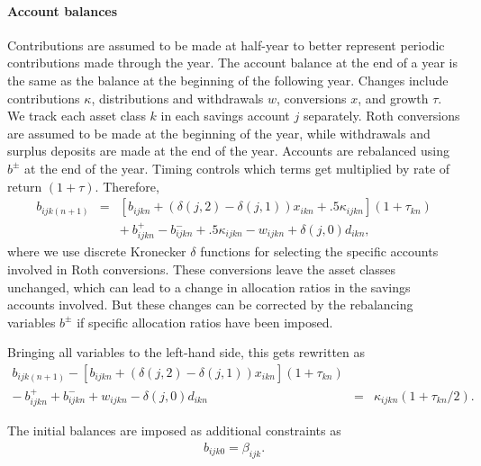 \documentclass{article}[fleqn,12pt]
\begin{document}
\paragraph*{Account balances}
	Contributions are assumed to be made at half-year to better represent periodic contributions
	made through the year.
	The account balance at the end of a year is the same as the balance
	at the beginning of the following year.
	Changes include contributions $\kappa$, distributions and withdrawals $w$,
	conversions $x$, and growth $\tau$.
	We track each asset class $k$ in each savings account $j$ separately.
	Roth conversions are assumed to be made at the beginning of the year, while withdrawals
	and surplus deposits are made at the end of the year.
	Accounts are rebalanced using $b^{\pm}$ at the end of the year.
	Timing controls which terms get multiplied by rate of return $(1 + \tau)$.
	Therefore,
	\begin{eqnarray}
		\label{Eq:C3a}
		b_{ijk(n+1)} &=& [b_{ijkn} + (\delta(j, 2) - \delta(j, 1))x_{ikn} 
		+ .5\kappa_{ijkn}](1 + \tau_{kn})
		\nonumber \\
		&& 
		+\ b^+_{ijkn} - b^-_{ijkn} 
		+ .5 \kappa_{ijkn} - w_{ijkn} + \delta(j, 0)d_{ikn},
	\end{eqnarray}
	where we use discrete Kronecker $\delta$ functions for selecting the specific accounts involved
	in Roth conversions. These conversions leave the asset classes unchanged, which can lead to a
	change in allocation ratios in the savings accounts involved. But these changes
	can be corrected by the rebalancing variables $b^\pm$ if
	specific allocation ratios have been imposed.

	Bringing all variables
	to the left-hand side, this gets rewritten as
	\begin{eqnarray}
		\label{Eq:C3}
		b_{ijk(n+1)} - [b_{ijkn} + (\delta(j, 2) - \delta(j, 1))x_{ikn}](1 + \tau_{kn})
		&& \nonumber \\
		- \ b^+_{ijkn} + b^-_{ijkn} 
		+ w_{ijkn}
		- \delta(j, 0)d_{ikn} 
		&=& \kappa_{ijkn} \left(1 + \tau_{kn}/2\right).
	\end{eqnarray}

	The initial balances are imposed as additional constraints as
	\begin{eqnarray}
		\label{Eq:InitialBalance}
		b_{ijk0} = \beta_{ijk}.
	\end{eqnarray}
\end{document}
